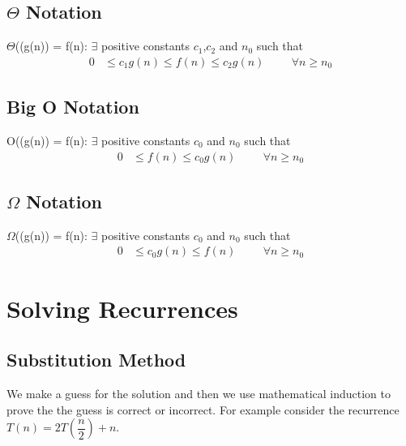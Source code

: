 \documentclass[a4paper,oneside]{book}
\begin{document}
\section{\texorpdfstring{$\Theta$}{Theta} Notation}
$\Theta$((g(n)) = f(n): $\exists$ positive constants $c_1$,$ c_2$ and $n_0$ such that 
\begin{align}
 0 &\le c_1g(n) \le  f(n)  \le  c_2g(n) \hspace{1cm} \forall  n \ge n_0            \label{ca:theta_not}
\end{align}
\section{Big O Notation}
O((g(n)) = f(n): $\exists$ positive constants $c_0$ and $n_0$ such that 
\begin{align}
 0 &\le  f(n)  \le  c_0g(n) \hspace{1cm} \forall  n \ge n_0            \label{ca:bigo_not}
\end{align}
\section{\texorpdfstring{$\Omega$}{Theta} Notation}
$\Omega$((g(n)) = f(n): $\exists$ positive constants $c_0$ and $n_0$ such that 
\begin{align}
 0 &\le  c_0g(n) \le  f(n)  \hspace{1cm} \forall  n \ge n_0            \label{ca:omega_not}
\end{align}
\chapter{Solving Recurrences}
\section{Substitution Method}
\begin{definition}
We make a guess for the solution and then we use mathematical induction to prove the the guess is correct or incorrect.
For example consider the recurrence $T(n) = 2T\left(\dfrac{n}{2}\right) + n$.
\label{def:substitution_method}
\end{definition}
\end{document}
